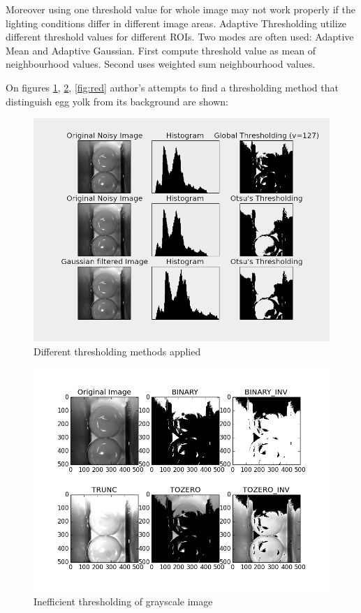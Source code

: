 \documentclass[12pt,twoside,a4paper]{article}
\begin{document}
Moreover using one threshold value for whole image may not work properly if the lighting conditions differ in different image areas.\cite{thre}
Adaptive Thresholding utilize different threshold values for different ROIs.
Two modes are often used: Adaptive Mean and Adaptive Gaussian.
First compute threshold value as mean of neighbourhood values.
Second uses weighted sum neighbourhood values.

On figures \ref{fig:diffthr}, \ref{fig:gray}, \ref{fig:red} author's attempts to find a thresholding method that distinguish egg yolk from its background are shown:

\begin{figure}[H]
\centering
\includegraphics[width=0.6\paperwidth]{diffthr}
\caption{Different thresholding methods applied}\label{fig:diffthr}
\end{figure}

\begin{figure}[H]
\centering
\includegraphics[width=0.6\paperwidth]{gray}
\caption{Inefficient thresholding of grayscale image}\label{fig:gray}
\end{figure}
\end{document}
